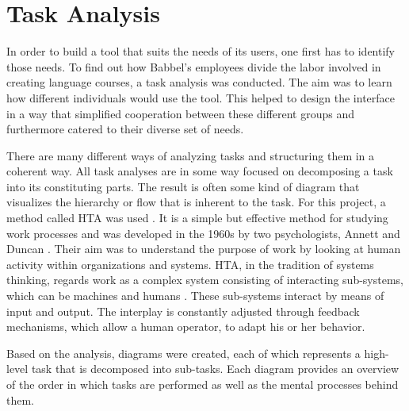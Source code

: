 \section{Task Analysis} \label{section:task-analysis}
In order to build a tool that suits the needs of its users, one first has to identify those needs. To find out how Babbel's employees divide the labor involved in creating language courses, a task analysis was conducted. The aim was to learn how different individuals would use the tool. This helped to design the interface in a way that simplified cooperation between these different groups and furthermore catered to their diverse set of needs.

There are many different ways of analyzing tasks and structuring them in a coherent way. All task analyses are in some way focused on decomposing a task into its constituting parts. The result is often some kind of diagram that visualizes the hierarchy or flow that is inherent to the task. For this project, a method called \ac{HTA} was used \cite{hornsby_hierarchical_2010}. It is a simple but effective method for studying work processes and was developed in the 1960s by two psychologists, Annett and Duncan \cite{shepherd_hierarchial_2000}. Their aim was to understand the purpose of work by looking at human activity within organizations and systems. HTA, in the tradition of systems thinking, regards work as a complex system consisting of  interacting sub-systems, which can be machines and humans \cite{shepherd_hierarchial_2000}. These sub-systems interact by means of input and output. The interplay is constantly adjusted through feedback mechanisms, which allow a human operator, to adapt his or her behavior.

Based on the analysis, diagrams were created, each of which represents a high-level task that is decomposed into sub-tasks. Each diagram provides an overview of the order in which tasks are performed as well as the mental processes behind them.



